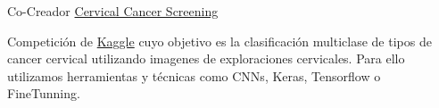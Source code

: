 \begin{cventries}
\cventry
{Co-Creador} %
{\href{https://github.com/mmaguero/Intel-mobileodt-cervical-cancer-screening}{Cervical Cancer Screening}} %
{} %
{} %
{ %
	\begin{cvitems}
		\item {Competición de \href{https://www.kaggle.com/c/intel-mobileodt-cervical-cancer-screening}{Kaggle} cuyo objetivo es la clasificación multiclase de tipos de cancer cervical utilizando imagenes de exploraciones cervicales. Para ello utilizamos herramientas y técnicas como CNNs, Keras, Tensorflow o FineTunning. }
	\end{cvitems}
}




\end{cventries}